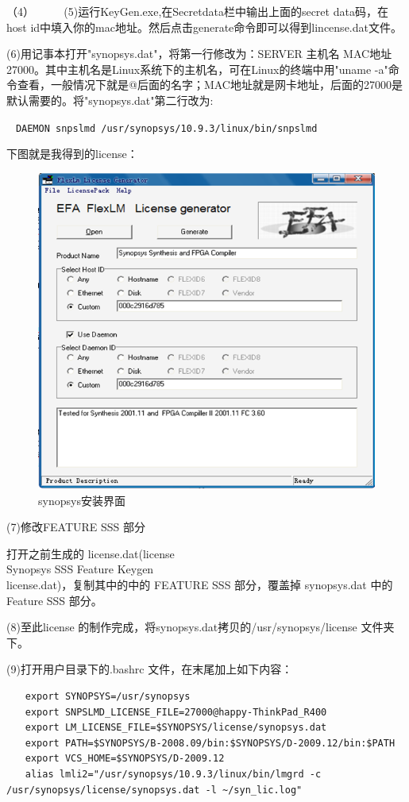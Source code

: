 （4）
　　
(5)运行KeyGen.exe,在Secretdata栏中输出上面的secret data码，在host id中填入你的mac地址。然后点击generate命令即可以得到lincense.dat文件。

(6)用记事本打开"synopsys.dat"，将第一行修改为：SERVER 主机名 MAC地址27000。其中主机名是Linux系统下的主机名，可在Linux的终端中用"uname -a"命令查看，一般情况下就是@后面的名字；MAC地址就是网卡地址，后面的27000是默认需要的。将"synopsys.dat"第二行改为:

\verb"　DAEMON snpslmd /usr/synopsys/10.9.3/linux/bin/snpslmd"

下图就是我得到的license：
\begin{figure}
\centering\includegraphics[scale=0.5]{figures/synopsys5.png}
\caption{synopsys安装界面}\label{synopsys5}
\end{figure}

(7)修改FEATURE SSS 部分

打开之前生成的 license.dat(license\\Synopsys SSS Feature Keygen\\license.dat)，复制其中的中的 FEATURE SSS 部分，覆盖掉 synopsys.dat 中的 Feature SSS 部分。

(8)至此license 的制作完成，将synopsys.dat拷贝的/usr/synopsys/license 文件夹下。

(9)打开用户目录下的.bashrc 文件，在末尾加上如下内容：
\begin{verbatim}
　　export SYNOPSYS=/usr/synopsys
　　export SNPSLMD_LICENSE_FILE=27000@happy-ThinkPad_R400
　　export LM_LICENSE_FILE=$SYNOPSYS/license/synopsys.dat
　　export PATH=$SYNOPSYS/B-2008.09/bin:$SYNOPSYS/D-2009.12/bin:$PATH
　　export VCS_HOME=$SYNOPSYS/D-2009.12
　　alias lmli2="/usr/synopsys/10.9.3/linux/bin/lmgrd -c /usr/synopsys/license/synopsys.dat -l ~/syn_lic.log"
\end{verbatim}

